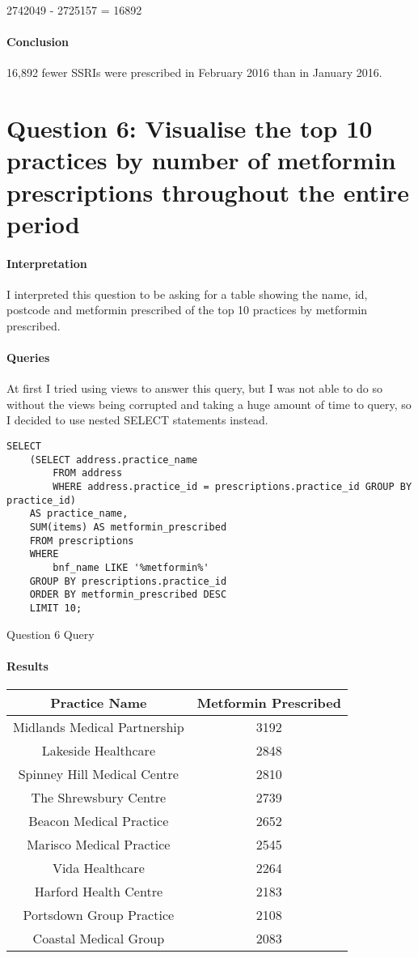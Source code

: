 \documentclass{report}
\begin{document}
2742049 - 2725157 = 16892
\paragraph{Conclusion}
16,892 fewer SSRIs were prescribed in February 2016 than in January 2016.

\section{Question 6: Visualise the top 10 practices by number of metformin prescriptions throughout the entire period}
\paragraph{Interpretation}
I interpreted this question to be asking for a table showing the name, id, postcode and metformin prescribed of the top 10 practices by metformin prescribed.
\paragraph{Queries}
At first I tried using views to answer this query, but I was not able to do so without the views being corrupted and taking a huge amount of time to query, so I decided to use nested SELECT statements instead.

\begin{listing}[H]
\begin{verbatim}
SELECT 
	(SELECT address.practice_name 
		FROM address 
		WHERE address.practice_id = prescriptions.practice_id GROUP BY practice_id) 
	AS practice_name, 
	SUM(items) AS metformin_prescribed 
	FROM prescriptions 
	WHERE 
		bnf_name LIKE '%metformin%' 
	GROUP BY prescriptions.practice_id 
	ORDER BY metformin_prescribed DESC 
	LIMIT 10;
\end{verbatim}
\caption{Question 6 Query}
\label{lst: Q6-1}
\end{listing}

\paragraph{Results}
\begin{center}
\begin{tabular}{ | c | c | }
\hline
Practice Name & Metformin Prescribed \\
\hline
Midlands Medical Partnership & 3192 \\
\hline
Lakeside Healthcare & 2848 \\
\hline
Spinney Hill Medical Centre & 2810 \\
\hline
The Shrewsbury Centre & 2739 \\
\hline
Beacon Medical Practice & 2652 \\
\hline
Marisco Medical Practice & 2545 \\
\hline
Vida Healthcare & 2264 \\
\hline
Harford Health Centre & 2183 \\
\hline
Portsdown Group Practice & 2108 \\
\hline
Coastal Medical Group & 2083 \\
\hline
\end{tabular}
\end{center}
\end{document}
